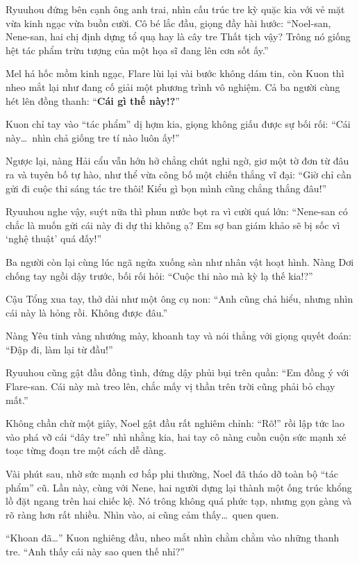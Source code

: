 \documentclass[../main.tex]{subfiles}
\begin{document}
Ryuuhou đứng bên cạnh ông anh trai, nhìn cấu trúc tre kỳ quặc kia với vẻ mặt vừa kinh ngạc vừa buồn cười. Cô bé lắc đầu, giọng đầy hài hước: ``Noel-san, Nene-san, hai chị định dựng tổ quạ hay là cây tre Thất tịch vậy? Trông nó giống hệt tác phẩm trừu tượng của một họa sĩ đang lên cơn sốt ấy.''

Mel há hốc mồm kinh ngạc, Flare lùi lại vài bước không dám tin, còn Kuon thì nheo mắt lại như đang cố giải một phương trình vô nghiệm. Cả ba người cùng hét lên đồng thanh: ``\textbf{Cái gì thế này!?}''

Kuon chỉ tay vào ``tác phẩm'' dị hợm kia, giọng không giấu được sự bối rối: ``Cái này\dots\ nhìn chả giống tre tí nào luôn ấy!''

Ngược lại, nàng Hải cẩu vẫn hớn hở chẳng chút nghi ngờ, giơ một tờ đơn từ đâu ra và tuyên bố tự hào, như thể vừa công bố một chiến thắng vĩ đại: ``Giờ chỉ cần gửi đi cuộc thi sáng tác tre thôi! Kiểu gì bọn mình cũng chẳng thắng đâu!''

Ryuuhou nghe vậy, suýt nữa thì phun nước bọt ra vì cười quá lớn: ``Nene-san có chắc là muốn gửi cái này đi dự thi không ạ? Em sợ ban giám khảo sẽ bị sốc vì `nghệ thuật' quá đấy!''

Ba người còn lại cùng lúc ngã ngửa xuống sàn như nhân vật hoạt hình. Nàng Dơi chống tay ngồi dậy trước, bối rối hỏi: ``Cuộc thi nào mà kỳ lạ thế kia!?''

Cậu Tổng xua tay, thở dài như một ông cụ non: ``Anh cũng chả hiểu, nhưng nhìn cái này là hỏng rồi. Không được đâu.''

Nàng Yêu tinh vàng nhướng mày, khoanh tay và nói thẳng với giọng quyết đoán: ``Đập đi, làm lại từ đầu!''

Ryuuhou cũng gật đầu đồng tình, đứng dậy phủi bụi trên quần: ``Em đồng ý với Flare-san. Cái này mà treo lên, chắc mấy vị thần trên trời cũng phải bỏ chạy mất.''

Không chần chừ một giây, Noel gật đầu rất nghiêm chỉnh: ``Rõ!'' rồi lập tức lao vào phá vỡ cái ``dây tre'' nhì nhằng kia, hai tay cô nàng cuồn cuộn sức mạnh xé toạc từng đoạn tre một cách dễ dàng.

Vài phút sau, nhờ sức mạnh cơ bắp phi thường, Noel đã tháo dỡ toàn bộ ``tác phẩm'' cũ. Lần này, cùng với Nene, hai người dựng lại thành một ống trúc khổng lồ đặt ngang trên hai chiếc kệ. Nó trông không quá phức tạp, nhưng gọn gàng và rõ ràng hơn rất nhiều. Nhìn vào, ai cũng cảm thấy\dots\ quen quen.


``Khoan đã\dots'' Kuon nghiêng đầu, nheo mắt nhìn chằm chằm vào những thanh tre. ``Anh thấy cái này sao quen thế nhỉ?''
\end{document}
